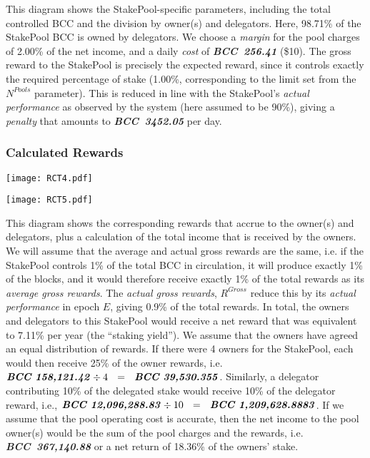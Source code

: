 \documentclass[11pt,a4paper,dvipsnames,twosided,final]{article}
\newcommand{\bcc}{BCC{}}
\newcommand{\BCC}[1]{\textbf{\emph{\bcc~{#1}}}}
\newcommand{\bcc}[1]{Bcc}
\begin{document}
\noindent
This diagram shows the StakePool-specific parameters, including the total controlled \bcc{} and the
division by owner(s) and delegators.  Here, 98.71\% of the StakePool \bcc{} is owned
by delegators.  We choose a \emph{margin} for the pool charges of 2.00\% of the net income,
and a daily \emph{cost} of \BCC{256.41} (\$10).
The gross reward to the StakePool is precisely the expected reward, since it controls
exactly the required percentage of stake (1.00\%, corresponding to the limit set from
the $N^{\textit{Pools}}$ parameter).  This is reduced in line with the StakePool's \emph{actual performance}
as observed by the system (here assumed to be 90\%), giving a \emph{penalty} that amounts
to \BCC{3452.05} per day.

\clearpage
\subsubsection*{Calculated Rewards}

\hspace{-0.65in}\begin{minipage}{\textwidth}
  \texttt{[image: RCT4.pdf]}
\vspace{-3.8in}

\texttt{[image: RCT5.pdf]}
\vspace{-3in}
\end{minipage}

\noindent
This diagram shows the corresponding rewards that accrue to the owner(s) and delegators,
plus a calculation of the total income that is received by the owners.  We will assume that the average
and actual gross rewards are the same, i.e. if the StakePool controls 1\% of the total \bcc{} in
circulation, it will produce exactly 1\% of the blocks, and it would therefore receive exactly 1\% of the total rewards
as its \emph{average gross rewards}.
The \emph{actual gross rewards}, $R^{\textit{Gross}}$ reduce this by its
\emph{actual performance} in epoch $E$, giving 0.9\% of the total rewards.
In total, the
owners and delegators to this StakePool would receive a net reward that was equivalent to 7.11\% per year
(the ``staking yield'').
We assume that the owners have agreed an equal distribution of rewards.
If there were 4 owners for the StakePool, each would then receive
25\% of the owner rewards, i.e. $\BCC{158,121.42} \div 4 ~~=~~ \BCC{39,530.355}$.
Similarly, a delegator contributing 10\% of the delegated stake would receive 10\% of
the delegator reward, i.e., $\BCC{12,096,288.83} \div 10 ~~=~~ \BCC{1,209,628.8883}$.
If we assume that the pool operating cost is accurate, then the net income to the pool owner(s) would be the sum of the
pool charges and the rewards, i.e. \BCC{367,140.88} or a net return of 18.36\% of the owners' stake.
\end{document}
